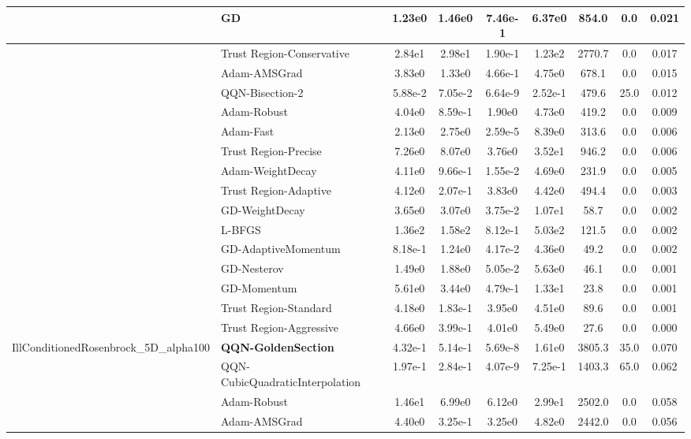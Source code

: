 \documentclass{article}
\begin{document}
\begin{longtable}{|l|l|c|c|c|c|c|c|c|}
\hline
 & GD & 1.23e0 & 1.46e0 & 7.46e-1 & 6.37e0 & 854.0 & 0.0 & 0.021 \\
\hline
 & Trust Region-Conservative & 2.84e1 & 2.98e1 & 1.90e-1 & 1.23e2 & 2770.7 & 0.0 & 0.017 \\
\hline
 & Adam-AMSGrad & 3.83e0 & 1.33e0 & 4.66e-1 & 4.75e0 & 678.1 & 0.0 & 0.015 \\
\hline
 & QQN-Bisection-2 & 5.88e-2 & 7.05e-2 & 6.64e-9 & 2.52e-1 & 479.6 & 25.0 & 0.012 \\
\hline
 & Adam-Robust & 4.04e0 & 8.59e-1 & 1.90e0 & 4.73e0 & 419.2 & 0.0 & 0.009 \\
\hline
 & Adam-Fast & 2.13e0 & 2.75e0 & 2.59e-5 & 8.39e0 & 313.6 & 0.0 & 0.006 \\
\hline
 & Trust Region-Precise & 7.26e0 & 8.07e0 & 3.76e0 & 3.52e1 & 946.2 & 0.0 & 0.006 \\
\hline
 & Adam-WeightDecay & 4.11e0 & 9.66e-1 & 1.55e-2 & 4.69e0 & 231.9 & 0.0 & 0.005 \\
\hline
 & Trust Region-Adaptive & 4.12e0 & 2.07e-1 & 3.83e0 & 4.42e0 & 494.4 & 0.0 & 0.003 \\
\hline
 & GD-WeightDecay & 3.65e0 & 3.07e0 & 3.75e-2 & 1.07e1 & 58.7 & 0.0 & 0.002 \\
\hline
 & L-BFGS & 1.36e2 & 1.58e2 & 8.12e-1 & 5.03e2 & 121.5 & 0.0 & 0.002 \\
\hline
 & GD-AdaptiveMomentum & 8.18e-1 & 1.24e0 & 4.17e-2 & 4.36e0 & 49.2 & 0.0 & 0.002 \\
\hline
 & GD-Nesterov & 1.49e0 & 1.88e0 & 5.05e-2 & 5.63e0 & 46.1 & 0.0 & 0.001 \\
\hline
 & GD-Momentum & 5.61e0 & 3.44e0 & 4.79e-1 & 1.33e1 & 23.8 & 0.0 & 0.001 \\
\hline
 & Trust Region-Standard & 4.18e0 & 1.83e-1 & 3.95e0 & 4.51e0 & 89.6 & 0.0 & 0.001 \\
\hline
 & Trust Region-Aggressive & 4.66e0 & 3.99e-1 & 4.01e0 & 5.49e0 & 27.6 & 0.0 & 0.000 \\
IllConditionedRosenbrock\_5D\_alpha100 & \textbf{QQN-GoldenSection} & 4.32e-1 & 5.14e-1 & 5.69e-8 & 1.61e0 & 3805.3 & 35.0 & 0.070 \\
\hline
 & QQN-CubicQuadraticInterpolation & 1.97e-1 & 2.84e-1 & 4.07e-9 & 7.25e-1 & 1403.3 & 65.0 & 0.062 \\
\hline
 & Adam-Robust & 1.46e1 & 6.99e0 & 6.12e0 & 2.99e1 & 2502.0 & 0.0 & 0.058 \\
\hline
 & Adam-AMSGrad & 4.40e0 & 3.25e-1 & 3.25e0 & 4.82e0 & 2442.0 & 0.0 & 0.056 \\

\end{longtable}
\end{document}
